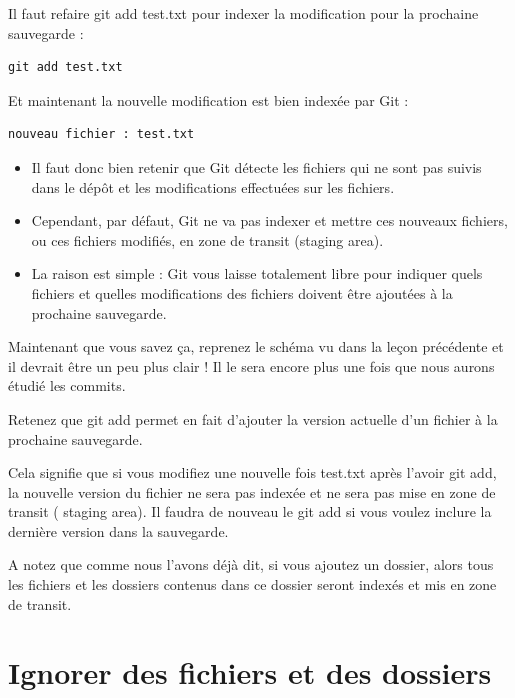 \documentclass{article}
\begin{document}
Il faut refaire {\color{blue} git add test.txt} pour indexer la modification pour la prochaine sauvegarde :


\begin{verbatim}
git add test.txt
\end{verbatim}

Et maintenant la nouvelle modification est bien indexée par {\color{blue} Git} :

\begin{verbatim}
nouveau fichier : test.txt
\end{verbatim}
\begin{itemize}
\item Il faut donc bien retenir que {\color{blue} Git} détecte les fichiers qui ne sont pas suivis dans le dépôt et les modifications effectuées sur les fichiers.

\item Cependant, par défaut, {\color{blue} Git} ne va pas indexer et mettre ces nouveaux fichiers, ou ces fichiers modifiés, en zone de transit (staging area).

\item La raison est simple : {\color{blue} Git} vous laisse totalement libre pour indiquer quels fichiers et quelles modifications des fichiers doivent être ajoutées à la prochaine sauvegarde.
\end{itemize}


Maintenant que vous savez ça, reprenez le schéma vu dans la leçon précédente et il devrait être un peu plus clair ! Il le sera encore plus une fois que nous aurons étudié les {\color{blue} commits}.

Retenez que {\color{blue} git add} permet en fait d'ajouter la version actuelle d'un fichier à la prochaine sauvegarde.

Cela signifie que si vous modifiez une nouvelle fois test.txt après l'avoir {\color{blue} git add}, la nouvelle version du fichier ne sera pas indexée et ne sera pas mise en zone de transit ({\color{blue} staging area}). Il faudra de nouveau le {\color{blue} git add} si vous voulez inclure la dernière version dans la sauvegarde.

A notez que comme nous l'avons déjà dit, si vous ajoutez un dossier, alors tous les fichiers et les dossiers contenus dans ce dossier seront indexés et mis en zone de transit.

\section{Ignorer des fichiers et des dossiers}
\end{document}
